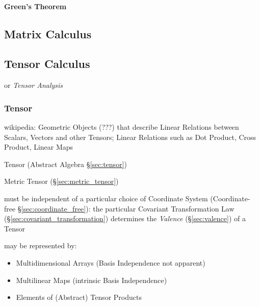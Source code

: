 \paragraph{Green's Theorem}\label{sec:greens_theorem}\hfill



\subsection{Matrix Calculus}\label{sec:matrix_calculus}

\subsection{Tensor Calculus}\label{sec:tensor_calculus}

or \emph{Tensor Analysis}



\subsubsection{Tensor}\label{sec:linear_tensor}

wikipedia: Geometric Objects (???) that describe Linear Relations
between Scalars, Vectors and other Tensors; Linear Relations such as
Dot Product, Cross Product, Linear Maps


\fist Tensor (Abstract Algebra \S\ref{sec:tensor})

\fist Metric Tensor (\S\ref{sec:metric_tensor})

must be independent of a particular choice of Coordinate System
(Coordinate-free \S\ref{sec:coordinate_free}): the particular Covariant
Transformation Law (\S\ref{sec:covariant_transformation}) determines
the \emph{Valence} (\S\ref{sec:valence}) of a Tensor

may be represented by:
\begin{itemize}
  \item Multidimensional Arrays (Basis Independence not apparent)
  \item Multilinear Maps (intrinsic Basis Independence)
  \item Elements of (Abstract) Tensor Products
\end{itemize}

